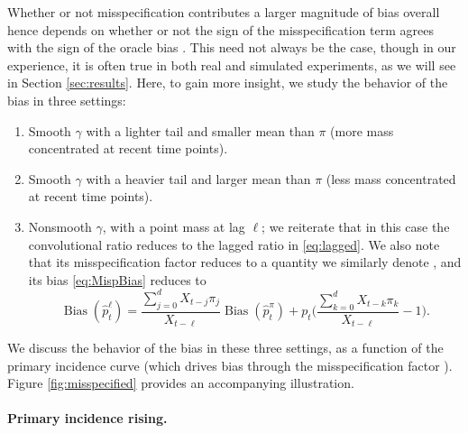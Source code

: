 \documentclass{article}
\renewcommand{\hat}{\widehat} %
\DeclareMathOperator{\bias}{Bias}
\begin{document}
Whether or not misspecification contributes a larger magnitude of bias overall
hence depends on whether or not the sign of the misspecification term  agrees with the sign of the oracle bias
\smash{$\bias(\hat{p}_t^\pi)$}. This need not always be the case, though in our
experience, it is often true in both real and simulated experiments, as we will
see in Section \ref{sec:results}. Here, to gain more insight, we study the
behavior of the bias in three settings: 
\begin{enumerate} 
\item Smooth $\gamma$ with a lighter tail and smaller mean than $\pi$ (more mass
  concentrated at recent time points).    
\item Smooth $\gamma$ with a heavier tail and larger mean than $\pi$ (less mass
  concentrated at recent time points).    
\item Nonsmooth $\gamma$, with a point mass at lag $\ell$; we reiterate that in 
  this case the convolutional ratio reduces to the lagged ratio
  \smash{$\hat{p}_t^\ell$} in \eqref{eq:lagged}. We also note that its
  misspecification factor  reduces to a quantity we
  similarly denote , and its bias \eqref{eq:MispBias} reduces to 
  \begin{equation}
  \label{eq:LagBias}
  \bias(\hat{p}_t^\ell) = \frac{\sum_{j=0}^d X_{t-j}\pi_j}{X_{t-\ell}}
  \bias(\hat{p}_t^\pi) + p_t\bigg (\frac{\sum_{k=0}^d
    X_{t-k}\pi_k}{X_{t-\ell}} - 1 \bigg). 
\end{equation}
\end{enumerate}

We discuss the behavior of the bias in these three settings, as a function of
the primary incidence curve (which drives bias through the misspecification
factor ). Figure \ref{fig:misspecified} provides an
accompanying illustration.

\paragraph{Primary incidence rising.} 
\end{document}
